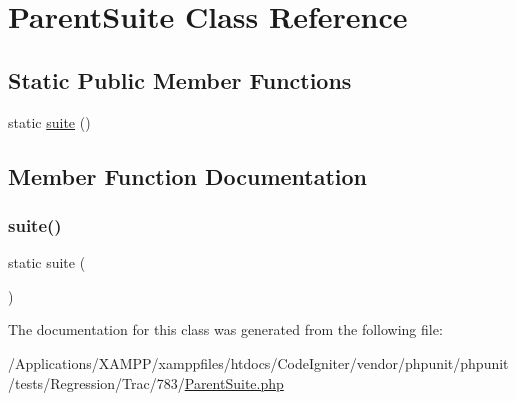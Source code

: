 \hypertarget{class_parent_suite}{}\section{Parent\+Suite Class Reference}
\label{class_parent_suite}
\subsection*{Static Public Member Functions}
\begin{DoxyCompactItemize}
\item 
static \mbox{\hyperlink{class_parent_suite_ae613daa28fb6b747c1940f6c9becccf7}{suite}} ()
\end{DoxyCompactItemize}


\subsection{Member Function Documentation}
\mbox{\label{class_parent_suite_ae613daa28fb6b747c1940f6c9becccf7}} 
\subsubsection{\texorpdfstring{suite()}{suite()}}
{\footnotesize\ttfamily static suite (\begin{DoxyParamCaption}{ }\end{DoxyParamCaption})\hspace{0.3cm}{\ttfamily [static]}}



The documentation for this class was generated from the following file\+:\begin{DoxyCompactItemize}
\item 
/\+Applications/\+X\+A\+M\+P\+P/xamppfiles/htdocs/\+Code\+Igniter/vendor/phpunit/phpunit/tests/\+Regression/\+Trac/783/\mbox{\hyperlink{_parent_suite_8php}{Parent\+Suite.\+php}}\end{DoxyCompactItemize}
